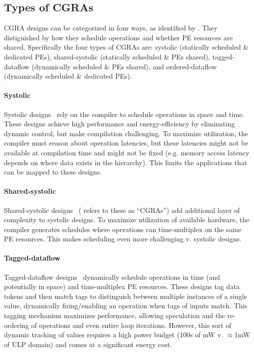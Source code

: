 \subsection{Types of CGRAs}
CGRA designs can be categorized in four ways, as identified by \cite{weng2020hybrid}.
% 
They distiguished by how they schedule operations and whether PE resources are shared.
% 
Specifically the four types of CGRAs are: systolic (statically scheduled \& dedicated PEs), shared-systolic (statically scheduled \& PEs shared),  tagged-dataflow (dynamically scheduled \& PEs shared), and ordered-dataflow (dynamically scheduled \& dedicated PEs).

\paragraph{Systolic}
Systolic designs~\cite{mishra2006tartan,goldstein2000piperench,fpca,warp,nowatzki:isca17:stream-dataflow} rely on the compiler to schedule operations in space and time.
% 
These designs achieve high performance and energy-efficiency by eliminating dynamic control, but make compilation challenging.
% 
To maximize utilization, the compiler must reason about operation latencies, but these latencies might not be available at compilation time and might not be fixed (e.g. memory access latency depends on where data exists in the hierarchy).
% 
This limits the applications that can be mapped to these designs.

\paragraph{Shared-systolic}
Shared-systolic designs~\cite{remarc,adres,morphosys,matrix,karunaratne2017hycube} (\cite{weng2020hybrid} refers to these as ``CGRAs'') add additional layer of complexity to systolic designs.
% 
To maximize utilization of available hardware, the compiler generates schedules where operations can time-multiplex on the same PE resources.
% 
This makes scheduling even more challenging v. systolic designs.

\paragraph{Tagged-dataflow}
Tagged-dataflow designs~\cite{swanson2003wavescalar,voitsechov2014single,ttda,trips,parashar2013triggered} dynamically schedule operations in time (and potentially in space) and time-multiplex PE resources.
% 
These designs tag data tokens and then match tags to distinguish between multiple instances of a single value, dynamically firing/enabling an operation when tags of inputs match.
% 
This tagging mechanism maximizes performance, allowing speculation and the re-ordering of operations and even entire loop iterations.
% 
However, this sort of dynamic tracking of values requires a high power budget (100s of mW v. $\approx$1mW of ULP domain) and comes at a significant energy cost.


